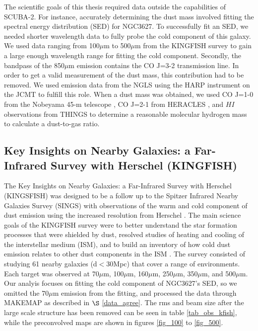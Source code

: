 The scientific goals of this thesis required data outside the capabilities of SCUBA-2.  For instance, accurately determining the dust mass involved fitting the spectral energy distribution (SED) for NGC3627.  To successfully fit an SED, we needed shorter wavelength data to fully probe the cold component of this galaxy. We used data ranging from 100$\mu$m to 500$\mu$m from the KINGFISH survey \citep{kennicutt2011} to gain a large enough wavelength range for fitting the cold component.  Secondly, the bandpass of the 850$\mu$m emission contains the CO J=3-2 transmission line.  In order to get a valid measurement of the dust mass, this contribution had to be removed.  We used emission data from the NGLS using the HARP instrument on the JCMT \citep{wilson2012} to fulfill this role.  When a dust mass was obtained, we used CO J=1-0 from the Nobeyama 45-m telescope \citep{kuno2007}, CO J=2-1 from HERACLES \citep{leroy2009}, and $HI$ observations from THINGS \citep{walter2008} to determine a reasonable molecular hydrogen mass to calculate a dust-to-gas ratio.

\subsection{Key Insights on Nearby Galaxies: a Far-Infrared Survey with Herschel (KINGFISH)}

The Key Insights on Nearby Galaxies: a Far-Infrared Survey with Herschel (KINGSFISH) was designed to be a follow up to the Spitzer Infrared Nearby Galaxies Survey (SINGS) \citep{kennicutt2003} with observations of the warm and cold component of dust emission using the increased resolution from Herschel \citep{kennicutt2011}.  The main science goals of the KINGFISH survey were to better understand the star formation processes that were shielded by dust, resolved studies of heating and cooling of the interstellar medium (ISM), and to build an inventory of how cold dust emission relates to other dust components in the ISM \citep{kennicutt2011}.  The survey consisted of studying 61 nearby galaxies (d$<$30Mpc) that cover a range of environments.  Each target was observed at 70$\mu$m, 100$\mu$m, 160$\mu$m, 250$\mu$m, 350$\mu$m, and 500$\mu$m.  Our analyis focuses on fitting the cold component of NGC3627's SED, so we omitted the 70$\mu$m emission from the fitting, and processed the data through MAKEMAP as described in $\S$ \ref{data_agree}.  The rms and beam size after the large scale structure has been removed can be seen in table \ref{tab_obs_kfish}, while the preconvolved maps are shown in figures \ref{fig_100} to \ref{fig_500}.

